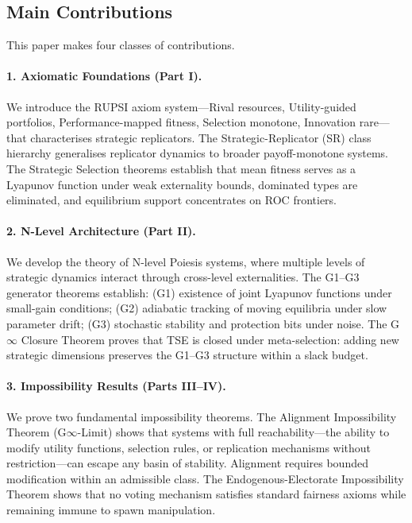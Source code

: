 \documentclass[12pt]{article}
\begin{document}
\subsection{Main Contributions}

This paper makes four classes of contributions.

\paragraph{1. Axiomatic Foundations (Part I).} We introduce the RUPSI axiom system---Rival resources, Utility-guided portfolios, Performance-mapped fitness, Selection monotone, Innovation rare---that characterises strategic replicators. The Strategic-Replicator (SR) class hierarchy generalises replicator dynamics to broader payoff-monotone systems. The Strategic Selection theorems establish that mean fitness serves as a Lyapunov function under weak externality bounds, dominated types are eliminated, and equilibrium support concentrates on ROC frontiers.

\paragraph{2. N-Level Architecture (Part II).} We develop the theory of N-level Poiesis systems, where multiple levels of strategic dynamics interact through cross-level externalities. The G1--G3 generator theorems establish: (G1) existence of joint Lyapunov functions under small-gain conditions; (G2) adiabatic tracking of moving equilibria under slow parameter drift; (G3) stochastic stability and protection bits under noise. The G$\infty$ Closure Theorem proves that TSE is closed under meta-selection: adding new strategic dimensions preserves the G1--G3 structure within a slack budget.

\paragraph{3. Impossibility Results (Parts III--IV).} We prove two fundamental impossibility theorems. The Alignment Impossibility Theorem (G$\infty$-Limit) shows that systems with full reachability---the ability to modify utility functions, selection rules, or replication mechanisms without restriction---can escape any basin of stability. Alignment requires bounded modification within an admissible class. The Endogenous-Electorate Impossibility Theorem shows that no voting mechanism satisfies standard fairness axioms while remaining immune to spawn manipulation.
\end{document}
